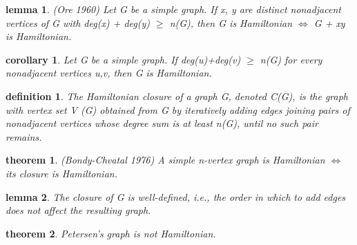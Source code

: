 \documentclass[twocolumn]{article}
\newtheorem{theorem}{theorem}[section]  %
\newtheorem{definition}{definition}
\newtheorem{lemma}{lemma}
\newtheorem{corollary}{corollary}
\newtheorem{problem}{problem}
\newtheorem{solution}{solution}
\begin{document}
\begin{CJK*}{UTF8}{bkai}
    \begin{lemma}{(Ore 1960)}
        Let G be a simple graph. If x, y are distinct nonadjacent vertices of G with 
deg(x) + deg(y) $\geq$ n(G), then G is Hamiltonian $\iff$ G + xy is Hamiltonian.

    \end{lemma}

    \begin{corollary}
         Let G be a simple graph. If deg(u)+deg(v) $\geq$ n(G) for every nonadjacent
 vertices u,v, then G is Hamiltonian.
    \end{corollary}

    \begin{definition}
        The Hamiltonian closure of a graph G, denoted C(G), is the graph with vertex
 set V (G) obtained from G by iteratively adding edges joining pairs of
 nonadjacent vertices whose degree sum is at least n(G), until no such pair
 remains.
    \end{definition}

    \begin{theorem}{(Bondy-Chvatal 1976)}
         A simple n-vertex graph is Hamiltonian $\iff$ its closure is Hamiltonian.
    \end{theorem}

    \begin{lemma}
        The closure of G is well-defined, i.e., the order in which to add edges does not
 affect the resulting graph.
    \end{lemma}

    \begin{theorem}
        Petersen's graph is not Hamiltonian.
    \end{theorem}

    
    


\end{CJK*}
\end{document}
